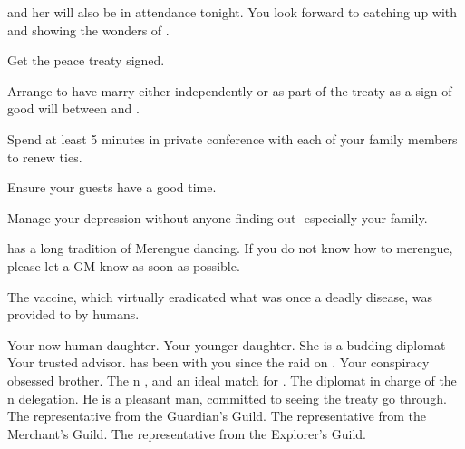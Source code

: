 \documentclass[char]{NeptuneBall}
\begin{document}
\cAriel{} and her \cWillow{\offspring} \cWillow{} will also be in attendance tonight. You look forward to catching up with \cAriel{} and showing \cWillow{} the wonders of \pAtlantis{}.

\begin{itemz}[Goals]
  \item Get the peace treaty signed.
  \item Arrange to have \cPrincess{} marry \cPrince{} either independently or as part of the treaty as a sign of good will between \pAtlantis{} and \pPacifica{}.
  \item Spend at least 5 minutes in private conference with each of your family members to renew ties.
  \item Ensure your guests have a good time.
  \item Manage your depression without anyone finding out -especially your family.
\end{itemz}

\begin{itemz}[Notes]
  \item \pAtlantis{} has a long tradition of Merengue dancing. If you do not know how to merengue, please let a GM know as soon as possible.
  \item The \pPolio{} vaccine, which virtually eradicated what was once a deadly disease, was provided to \pAtlantis{} by humans.
\end{itemz}

\begin{contacts}
  \contact{\cAriel{}} Your now-human daughter.
  \contact{\cPrincess{}} Your younger daughter. She is a budding diplomat
  \contact{\cManta{}} Your trusted advisor. \cManta{\They{}} has been with you since the raid on \pPacifica{}.
  \contact{\cPlant{}} Your conspiracy obsessed brother.
  \contact{\cPrince{}} The \pPacifica{}n \cPrince{\prince}, and an ideal match for \cPrincess{}.
  \contact{\cDiplomat{}} The diplomat in charge of the \pPacifica{}n delegation. He is a pleasant man, committed to seeing the treaty go through.
  \contact{\cGeneral{}} The representative from the Guardian's Guild.
  \contact{\cSlave{}} The representative from the Merchant's Guild.
  \contact{\cPriest{}} The representative from the Explorer's Guild.
\end{contacts}
\end{document}
